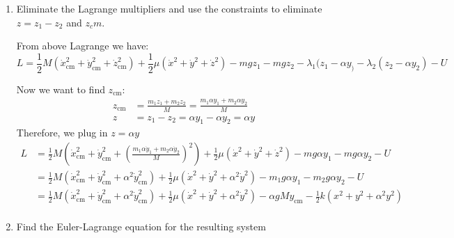 \documentclass{article}
\begin{document}
\begin{enumerate}
\begin{enumerate}
        \item Eliminate the Lagrange multipliers and use the constraints to eliminate $z = z_1 - z_2$ and $z_cm$.

        From above Lagrange we have:
        \[
            L = \frac{1}{2}M (\dot x_\text{cm}^2 + \dot y_\text{cm}^2 + \dot z_\text{cm}^2) + \frac{1}{2} \mu (\dot x^2 + \dot y^2 + \dot z^2) - mgz_1 - mgz_2 - \lambda_1 (z_1 - \alpha y_) - \lambda_2 (z_2 - \alpha y_2) - U
        \]

        Now we want to find $z_\text{cm}$:
        \begin{align*}
            z_\text{cm} &= \frac{m_1 z_1 + m_2 z_2}{M} = \frac{m_1 \alpha y_1 + m_2 \alpha y_2}{M} \\
            z &= z_1 - z_2 = \alpha y_1 - \alpha y_2 = \alpha y
        \end{align*}
        Therefore, we plug in $z = \alpha y$
        \begin{align*}
            L &= \frac{1}{2}M (\dot x_\text{cm}^2 + \dot y_\text{cm}^2 + (\frac{m_1 \alpha \dot y_1 + m_2 \alpha \dot y_2}{M})^2) + \frac{1}{2}\mu (\dot x^2 + \dot y^2 + \dot z^2) - mg\alpha y_1 - mg\alpha y_2 - U \\
              &=\frac{1}{2}M (\dot x_\text{cm}^2 + \dot y_\text{cm}^2 + \alpha^2 \dot y_\text{cm}^2) + \frac{1}{2}\mu (\dot x^2 + \dot y^2 + \alpha^2 \dot y^2) - m_1g\alpha y_1 - m_2g\alpha y_2 - U \\
              &= \frac{1}{2}M (\dot x_\text{cm}^2 + \dot y_\text{cm}^2 + \alpha^2 \dot y_\text{cm}^2) + \frac{1}{2}\mu (\dot x^2 + \dot y^2 + \alpha^2 \dot y^2) - \alpha g M y_\text{cm} - \frac{1}{2} k(x^2 + y^2 + \alpha^2 y^2) \\
        \end{align*}
        \item Find the Euler-Lagrange equation for the resulting system\\


\end{enumerate}
\end{enumerate}
\end{document}
